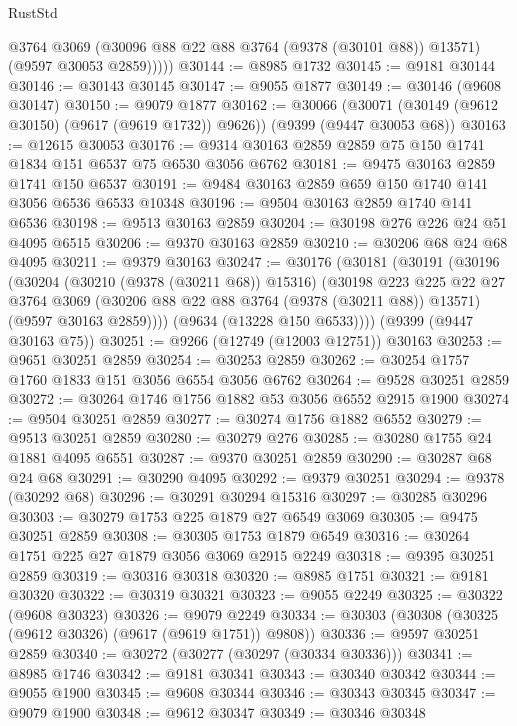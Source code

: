 \begin{lexlean}{RustStd}
\begin{coremodule}
            @3764
            @3069
            (@30096 @88 @22 @88 @3764 (@9378 (@30101 @88)) @13571)
            (@9597 @30053 @2859)))))
@30144 := @8985 @1732
@30145 := @9181 @30144
@30146 := @30143 @30145
@30147 := @9055 @1877
@30149 := @30146 (@9608 @30147)
@30150 := @9079 @1877
@30162 := @30066
    (@30071 (@30149 (@9612 @30150) (@9617 (@9619 @1732)) @9626))
    (@9399 (@9447 @30053 @68))
@30163 := @12615 @30053
@30176 := @9314 @30163 @2859 @2859 @75 @150 @1741 @1834 @151 @6537 @75 @6530 @3056 @6762
@30181 := @9475 @30163 @2859 @1741 @150 @6537
@30191 := @9484 @30163 @2859 @659 @150 @1740 @141 @3056 @6536 @6533 @10348
@30196 := @9504 @30163 @2859 @1740 @141 @6536
@30198 := @9513 @30163 @2859
@30204 := @30198 @276 @226 @24 @51 @4095 @6515
@30206 := @9370 @30163 @2859
@30210 := @30206 @68 @24 @68 @4095
@30211 := @9379 @30163
@30247 := @30176
    (@30181
      (@30191
        (@30196
          (@30204
            (@30210 (@9378 (@30211 @68)) @15316)
            (@30198
              @223
              @225
              @22
              @27
              @3764
              @3069
              (@30206 @88 @22 @88 @3764 (@9378 (@30211 @88)) @13571)
              (@9597 @30163 @2859))))
        (@9634 (@13228 @150 @6533))))
    (@9399 (@9447 @30163 @75))
@30251 := @9266 (@12749 (@12003 @12751)) @30163
@30253 := @9651 @30251 @2859
@30254 := @30253 @2859
@30262 := @30254 @1757 @1760 @1833 @151 @3056 @6554 @3056 @6762
@30264 := @9528 @30251 @2859
@30272 := @30264 @1746 @1756 @1882 @53 @3056 @6552 @2915 @1900
@30274 := @9504 @30251 @2859
@30277 := @30274 @1756 @1882 @6552
@30279 := @9513 @30251 @2859
@30280 := @30279 @276
@30285 := @30280 @1755 @24 @1881 @4095 @6551
@30287 := @9370 @30251 @2859
@30290 := @30287 @68 @24 @68
@30291 := @30290 @4095
@30292 := @9379 @30251
@30294 := @9378 (@30292 @68)
@30296 := @30291 @30294 @15316
@30297 := @30285 @30296
@30303 := @30279 @1753 @225 @1879 @27 @6549 @3069
@30305 := @9475 @30251 @2859
@30308 := @30305 @1753 @1879 @6549
@30316 := @30264 @1751 @225 @27 @1879 @3056 @3069 @2915 @2249
@30318 := @9395 @30251 @2859
@30319 := @30316 @30318
@30320 := @8985 @1751
@30321 := @9181 @30320
@30322 := @30319 @30321
@30323 := @9055 @2249
@30325 := @30322 (@9608 @30323)
@30326 := @9079 @2249
@30334 := @30303 (@30308 (@30325 (@9612 @30326) (@9617 (@9619 @1751)) @9808))
@30336 := @9597 @30251 @2859
@30340 := @30272 (@30277 (@30297 (@30334 @30336)))
@30341 := @8985 @1746
@30342 := @9181 @30341
@30343 := @30340 @30342
@30344 := @9055 @1900
@30345 := @9608 @30344
@30346 := @30343 @30345
@30347 := @9079 @1900
@30348 := @9612 @30347
@30349 := @30346 @30348

\end{coremodule}
\end{lexlean}
